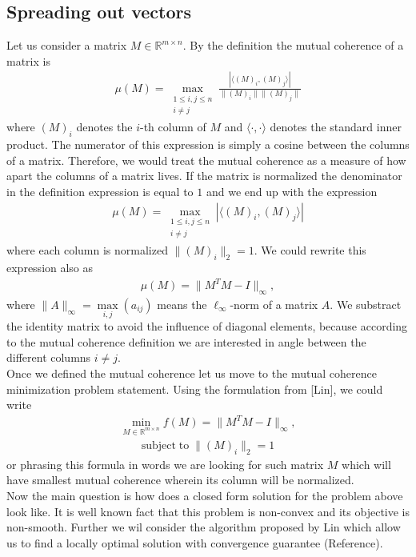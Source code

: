 \documentclass[journal]{IEEEtran}
\begin{document}
\subsection{Spreading out vectors}
Let us consider a matrix $ M\in \mathbb{ R}^{m\times n}$. By the definition the mutual coherence of a matrix is
\begin{align}
\mu(M)=\max\limits_{\substack{1\leq i,j \leq n \\ i\neq j}}\frac{|\langle (M)_i, (M)_j \rangle |}{\|(M)_i\| \|(M)_j\|}
\end{align}
where $ (M)_i$ denotes the $i$-th column of $M$ and $\langle\cdot , \cdot \rangle $ denotes the standard inner product. The numerator of this expression is simply a cosine between the columns of a matrix. Therefore, we would treat the mutual coherence as a measure of how apart the columns of a matrix lives.  If the matrix is normalized the denominator in the definition expression is equal to $1$ and we end up with  the expression
\begin{align}
\mu(M)=\max\limits_{\substack{1\leq i,j \leq n \\ i\neq j}}|\langle (M)_i, (M)_j \rangle |
\end{align}
where each column is normalized $ \|(M)_i\|_2=1$.  We could rewrite this expression also as
\begin{align}
\mu(M)=\|M^TM-I\|_{\infty},
\end{align}
where $\|A \|_{\infty}=\max\limits_{i,j}(a_{ij})$ means the $\ell_{\infty}$-norm of a matrix $A$. We substract the identity matrix to avoid the influence of diagonal elements, because according to the mutual coherence definition we are interested in angle between the different columns $i\neq j$. \\
Once we defined the mutual coherence let us move to the mutual coherence minimization problem statement.  Using the formulation from [Lin], we could write
\begin{align}
\min_{M\in\mathbb{R}^{m\times n}}f(M)=\|M^TM-I\|_{\infty},
\end{align}
\begin{align}
\textrm{subject}\;\textrm{to} \;\|(M)_i\|_2=1
\end{align}
or phrasing this formula  in words we are looking for such matrix $M$ which will have smallest mutual coherence wherein its column will be normalized. \\
Now the main question is how does a closed form solution for the problem above look like. It is well known fact that this problem is non-convex and its objective is non-smooth. Further we wil consider the algorithm proposed by Lin which allow us to find a locally optimal solution with convergence guarantee (Reference). \\
\end{document}
